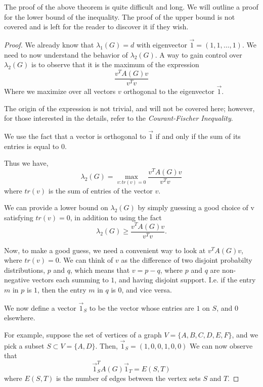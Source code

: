 \documentclass{article}
\theoremstyle{theorem}
\theoremstyle{definition}
\theoremstyle{example}
\theoremstyle{proposition}
\begin{document}
        The proof of the above theorem is quite difficult and long. We will outline a proof for the lower bound of the inequality. The proof of the upper bound is not covered and is left for the reader to discover it if they wish.

        \begin{proof}
            We already know that $\lambda_1(G) = d$ with eigenvector $\vec{1} = (1,1,\ldots,1)$.
            We need to now understand the behavior of $\lambda_2(G)$.
            A way to gain control over $\lambda_2(G)$ is to observe that it is the maximum of the expression
            \[\frac{v^{T}A(G)v}{v^{T}v}\]
            Where we maximize over all vectors $v$ orthogonal to the eigenvector $\vec{1}$.

            The origin of the expression is not trivial, and will not be covered here; however, for those interested in the details, refer to the \textit{Courant-Fischer Inequality}.

            We use the fact that a vector is orthogonal to $\vec{1}$ if and only if the sum of its entries is equal to $0$.

            Thus we have,
            \[\lambda_2(G) = \max\limits_{v:tr(v)=0} \frac{v^{T}A(G)v}{v^{T}v}\]
            where $tr(v)$ is the sum of entries of the vector $v$.

            We can provide a lower bound on $\lambda_2(G)$ by simply guessing a good choice of v satisfying $tr(v) = 0$, in addition to using the fact
            \[\lambda_2(G) \geq \frac{v^{T}A(G)v}{v^{T}v}\textit{.}\]

            Now, to make a good guess, we need a convenient way to look at $v^{T}A(G)v$, where $tr(v) = 0$.
            We can think of $v$ as the difference of two disjoint probabilty distributions, $p$ and $q$, which means that $v = p - q$, where $p$ and $q$ are non-negative vectors each summing to $1$, and having disjoint support. I.e. if the entry $m$ in $p$ is $1$, then the entry $m$ in $q$ is $0$, and vice versa.

            We now define a vector $\vec{1}_S$ to be the vector whose entries are $1$ on $S$, and $0$ elsewhere.

            For example, suppose the set of vertices of a graph $V = \{A, B, C, D, E, F\}$, and we pick a subset $S \subset V = \{A, D\}$. Then, $\vec{1}_S = (1, 0, 0, 1, 0, 0)$
            \newpage
            We can now observe that 
            \[\vec{1}_S^{T}A(G)\vec{1}_T = E(S, T)\]
            where $E(S,T)$ is the number of edges between the vertex sets $S$ and $T$.


\end{proof}
\end{document}
